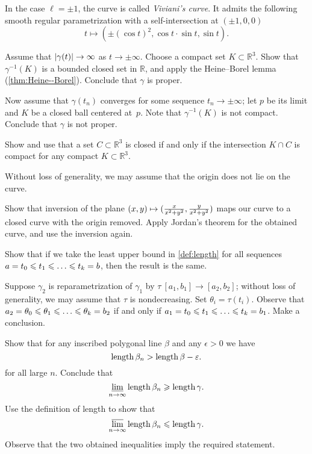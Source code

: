 \begin{multicols}{2}
In the case $\ell=\pm1$, the curve is called \emph{Viviani's curve}.
It admits the following smooth regular parametrization with a self-intersection at $(\pm1,0,0)$
\[t\mapsto(\pm(\cos t)^2,\cos t\cdot\sin t,\sin t).\]

Assume that $|\gamma(t)|\z\to\infty$ as $t\to\pm\infty$.
Choose a compact set $K\subset \mathbb{R}^3$.
Show that $\gamma^{-1}(K)$ is a bounded closed set in $\mathbb{R}$,
and apply the Heine--Borel lemma (\ref{thm:Heine--Borel}).
Conclude that $\gamma$ is proper.

Now assume that $\gamma(t_n)$ converges for some sequence $t_n\to \pm \infty$; let $p$ be its limit and $K$ be a closed ball centered at~$p$.
Note that $\gamma^{-1}(K)$ is not compact.
Conclude that $\gamma$ is not proper.

Show and use that a set $C\subset \mathbb{R}^3$ is closed if and only if the intersection $K\cap C$ is compact for any compact $K\subset \mathbb{R}^3$.

Without loss of generality, we may assume that the origin does not lie on the curve.

Show that inversion of the plane $(x,y)\z\mapsto (\tfrac{x}{x^2+y^2},\tfrac{y}{x^2+y^2})$ maps our curve to a closed curve with the origin removed.
Apply Jordan's theorem for the obtained curve, and use the inversion again.


\setcounter{eqtn}{0}

Show that if we take the least upper bound in \ref{def:length} for all sequences
$a=t_0\le t_1\le\z\dots\le t_k=b$, then the result is the same.

Suppose $\gamma_2$ is reparametrization of $\gamma_1$ by $\tau\:[a_1,b_1]\to [a_2,b_2]$;
without loss of generality, we may assume that $\tau$ is nondecreasing.
Set $\theta_i=\tau(t_i)$.
Observe that $a_2=\theta_0\z\le\theta_1\le \z\dots\le\theta_k=b_2$ if and only if 
$a_1=t_0\le t_1\le\z\dots\le t_k=b_1$.
Make a conclusion.

Show that for any inscribed polygonal line $\beta$ and any $\epsilon>0$ we have
\[\mathop{\rm length}\nolimits\beta_n>\mathop{\rm length}\nolimits\beta-\varepsilon.\]
for all large $n$.
Conclude that
\[\varliminf_{n\to\infty}\mathop{\rm length}\nolimits\beta_n\geqslant \mathop{\rm length}\nolimits \gamma.\]
Use the definition of length to show that 
\[\varlimsup_{n\to\infty}\mathop{\rm length}\nolimits\beta_n\leqslant \mathop{\rm length}\nolimits \gamma.\]
Observe that the two obtained inequalities imply the required statement.


\end{multicols}
